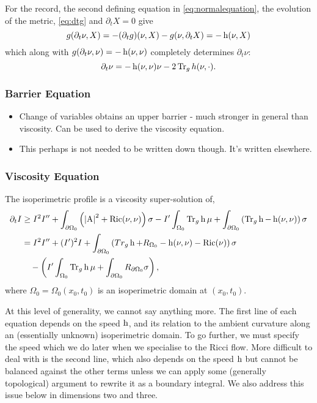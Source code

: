\documentclass{amsart}
\begin{document}
\begin{rem}
For the record, the second defining equation in \eqref{eq:normalequation}, the evolution of the metric, \eqref{eq:dtg} and \(\partial_t X = 0\) give
\[
g(\partial_t \nu, X) = -(\partial_t g) (\nu, X) - g(\nu, \partial_t X) = -\operatorname{h}(\nu, X)
\]
which along with \(g(\partial_t \nu, \nu) = - \operatorname{h}(\nu, \nu)\) completely determines \(\partial_t \nu\):
\[
\partial_t \nu = -\operatorname{h}(\nu, \nu) \nu - 2\operatorname{Tr}_g h(\nu, \cdot).
\]
\end{rem}

\subsubsection{Barrier Equation}

\begin{itemize}
\item Change of variables obtains an upper barrier - much stronger in general than viscosity. Can be used to derive the viscosity equation.
\item This perhaps is not needed to be written down though. It's written elsewhere.
\end{itemize}

\subsubsection{Viscosity Equation}
\label{subsec:iso_diff_ineq_viscosity}

\begin{thm}
\label{thm:general_viscosity}
The isoperimetric profile is a viscosity super-solution of,
\[
\begin{split}
\partial_t I &\geq I^2 I'' +  \int_{\partial {\Omega_0}} \left(\left|{\operatorname{A}}\right|^2 + \operatorname{Ric}(\nu, \nu)\right) \sigma  - I'\int_{\Omega_0} \operatorname{Tr}_g \operatorname{h} \mu + \int_{\partial {\Omega_0}} \left(\operatorname{Tr}_g \operatorname{h} - \operatorname{h}(\nu, \nu)\right) \sigma \\
&= I^2 I'' +  (I')^2 I + \int_{\partial {\Omega_0}} \left(Tr_g \operatorname{h} + R_{\Omega_0} - \operatorname{h}(\nu, \nu) - \operatorname{Ric}(\nu)\right) \sigma \\
&\quad - \left(I'\int_{\Omega_0} \operatorname{Tr}_g \operatorname{h} \mu + \int_{\partial {\Omega_0}} R_{\partial {\Omega_0}}\sigma \right),
\end{split}
\]
where \(\Omega_0 = \Omega_0(x_0, t_0)\) is an isoperimetric domain at \((x_0, t_0)\).
\end{thm}

\begin{rem}
At this level of generality, we cannot say anything more. The first line of each equation depends on the speed \(\operatorname{h}\), and its relation to the ambient curvature along an (essentially unknown) isoperimetric domain. To go further, we must specify the speed which we do later when we specialise to the Ricci flow. More difficult to deal with is the second line, which also depends on the speed \(\operatorname{h}\) but cannot be balanced against the other terms unless we can apply some (generally topological) argument to rewrite it as a boundary integral. We also address this issue below in dimensions two and three.
\end{rem}
\end{document}
